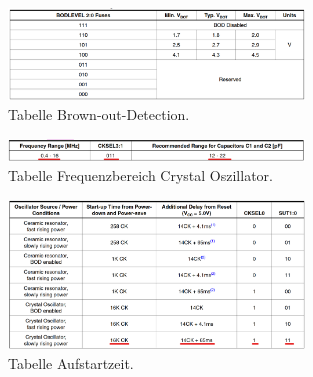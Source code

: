 
\begin{figure}[H]
	\centering
	\includegraphics[width=0.7\textwidth]{graphics/Tabelle_BoD}
	\caption{Tabelle Brown-out-Detection.\cite[S.361]{atmel_atmel_2014}}
	\label{fig:Tabelle_BoD}
\end{figure}


\begin{figure}[H]
	\centering
	\includegraphics[width=0.7\textwidth]{graphics/Tabelle_Crystal}
	\caption{Tabelle Frequenzbereich Crystal Oszillator.\cite[S.43]{atmel_atmel_2014}}
	\label{fig:Tabelle_Crystal}
\end{figure}

\begin{figure}[H]
	\centering
	\includegraphics[width=0.7\textwidth]{graphics/Tabelle_Crystal2}
	\caption{Tabelle Aufstartzeit.\cite[S.43]{atmel_atmel_2014}}
	\label{fig:Tabelle_Crystal2}
\end{figure}


